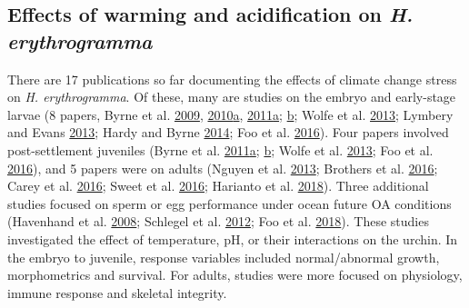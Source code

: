 \documentclass[a4paper,10pt, oneside]{memoir}
\begin{document}
\hypertarget{effects-of-warming-and-acidification-on-h.-erythrogramma}{%
\subsection{\texorpdfstring{Effects of warming and acidification on \emph{H. erythrogramma}}{Effects of warming and acidification on H. erythrogramma}}\label{effects-of-warming-and-acidification-on-h.-erythrogramma}}

There are 17 publications so far documenting the effects of climate change stress on \emph{H. erythrogramma}. Of these, many are studies on the embryo and early-stage larvae (8 papers, Byrne et al. \protect\hyperlink{ref-Byrne2009}{2009}, \protect\hyperlink{ref-Byrne2010}{2010}\protect\hyperlink{ref-Byrne2010}{a}, \protect\hyperlink{ref-Byrne2011}{2011}\protect\hyperlink{ref-Byrne2011}{a}; \protect\hyperlink{ref-Byrne2011a}{b}; Wolfe et al. \protect\hyperlink{ref-Wolfe2013}{2013}; Lymbery and Evans \protect\hyperlink{ref-Lymbery2013}{2013}; Hardy and Byrne \protect\hyperlink{ref-Hardy2014}{2014}; Foo et al. \protect\hyperlink{ref-Foo2016}{2016}).
Four papers involved post-settlement juveniles (Byrne et al. \protect\hyperlink{ref-Byrne2011}{2011}\protect\hyperlink{ref-Byrne2011}{a}; \protect\hyperlink{ref-Byrne2011a}{b}; Wolfe et al. \protect\hyperlink{ref-Wolfe2013}{2013}; Foo et al. \protect\hyperlink{ref-Foo2016}{2016}), and 5 papers were on adults (Nguyen et al. \protect\hyperlink{ref-Nguyen2013}{2013}; Brothers et al. \protect\hyperlink{ref-Brothers2016}{2016}; Carey et al. \protect\hyperlink{ref-Carey2016}{2016}; Sweet et al. \protect\hyperlink{ref-Sweet2016}{2016}; Harianto et al. \protect\hyperlink{ref-Harianto2018}{2018}).
Three additional studies focused on sperm or egg performance under ocean future OA conditions (Havenhand et al. \protect\hyperlink{ref-Havenhand2008}{2008}; Schlegel et al. \protect\hyperlink{ref-Schlegel2012}{2012}; Foo et al. \protect\hyperlink{ref-Foo2018}{2018}).
These studies investigated the effect of temperature, pH, or their interactions on the urchin.
In the embryo to juvenile, response variables included normal/abnormal growth, morphometrics and survival.
For adults, studies were more focused on physiology, immune response and skeletal integrity.
\end{document}
